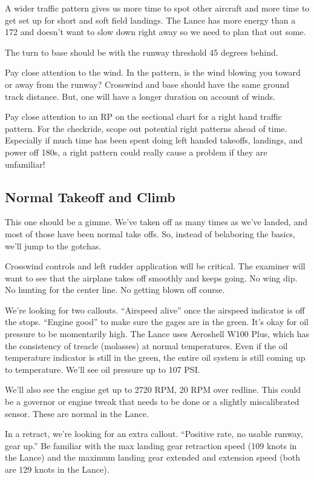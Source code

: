 A wider traffic pattern gives us more time to spot other aircraft and more time to get set up for short and soft field landings. The Lance has more energy than a 172 and doesn't want to slow down right away so we need to plan that out some.

The turn to base should be with the runway threshold 45 degrees behind.

Pay close attention to the wind. In the pattern, is the wind blowing you toward or away from the runway? Crosswind and base should have the same ground track distance. But, one will have a longer duration on account of winds.

Pay close attention to an RP on the sectional chart for a right hand traffic pattern. For the checkride, scope out potential right patterns ahead of time. Especially if much time has been spent doing left handed takeoffs, landings, and power off 180s, a right pattern could really cause a problem if they are unfamiliar!

\subsection{Normal Takeoff and Climb}

This one should be a gimme. We've taken off as many times as we've landed, and most of those have been normal take offs. So, instead of belaboring the basics, we'll jump to the gotchas.

Crosswind controls and left rudder application will be critical. The examiner will want to see that the airplane takes off smoothly and keeps going. No wing dip. No hunting for the center line. No getting blown off course.

We're looking for two callouts. ``Airspeed alive'' once the airspeed indicator is off the stops. ``Engine good'' to make sure the gages are in the green. It's okay for oil pressure to be momentarily high. The Lance uses Aeroshell W100 Plus, which has the consistency of treacle (molasses) at normal temperatures. Even if the oil temperature indicator is still in the green, the entire oil system is still coming up to temperature. We'll see oil pressure up to 107 PSI.

We'll also see the engine get up to 2720 RPM, 20 RPM over redline. This could be a governor or engine tweak that needs to be done or a slightly miscalibrated sensor. These are normal in the Lance.

In a retract, we're looking for an extra callout. ``Positive rate, no usable runway, gear up.'' Be familiar with the max landing gear retraction speed (109 knots in the Lance) and the maximum landing gear extended and extension speed (both are 129 knots in the Lance).

